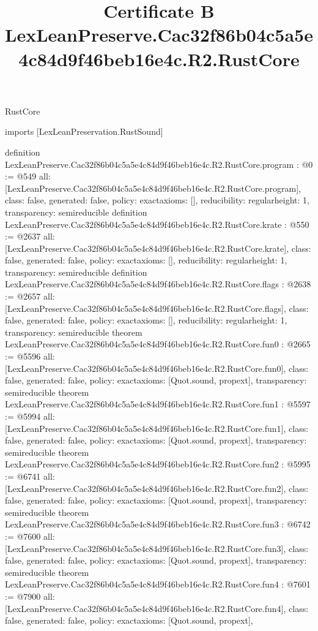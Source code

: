 \begin{lexlean}{RustCore}
\title{Certificate B LexLeanPreserve.Cac32f86b04c5a5e4c84d9f46beb16e4c.R2.RustCore}
\begin{coremodule}
imports [LexLeanPreservation.RustSound]

definition LexLeanPreserve.Cac32f86b04c5a5e4c84d9f46beb16e4c.R2.RustCore.program : @0 := @549 {
  all: [LexLeanPreserve.Cac32f86b04c5a5e4c84d9f46beb16e4c.R2.RustCore.program],
  class: false,
  generated: false,
  policy: exact{axioms: []},
  reducibility: regular{height: 1},
  transparency: semireducible
}
definition LexLeanPreserve.Cac32f86b04c5a5e4c84d9f46beb16e4c.R2.RustCore.krate : @550 := @2637 {
  all: [LexLeanPreserve.Cac32f86b04c5a5e4c84d9f46beb16e4c.R2.RustCore.krate],
  class: false,
  generated: false,
  policy: exact{axioms: []},
  reducibility: regular{height: 1},
  transparency: semireducible
}
definition LexLeanPreserve.Cac32f86b04c5a5e4c84d9f46beb16e4c.R2.RustCore.flags : @2638 := @2657 {
  all: [LexLeanPreserve.Cac32f86b04c5a5e4c84d9f46beb16e4c.R2.RustCore.flags],
  class: false,
  generated: false,
  policy: exact{axioms: []},
  reducibility: regular{height: 1},
  transparency: semireducible
}
theorem LexLeanPreserve.Cac32f86b04c5a5e4c84d9f46beb16e4c.R2.RustCore.fun0 : @2665 := @5596 {
  all: [LexLeanPreserve.Cac32f86b04c5a5e4c84d9f46beb16e4c.R2.RustCore.fun0],
  class: false,
  generated: false,
  policy: exact{axioms: [Quot.sound, propext]},
  transparency: semireducible
}
theorem LexLeanPreserve.Cac32f86b04c5a5e4c84d9f46beb16e4c.R2.RustCore.fun1 : @5597 := @5994 {
  all: [LexLeanPreserve.Cac32f86b04c5a5e4c84d9f46beb16e4c.R2.RustCore.fun1],
  class: false,
  generated: false,
  policy: exact{axioms: [Quot.sound, propext]},
  transparency: semireducible
}
theorem LexLeanPreserve.Cac32f86b04c5a5e4c84d9f46beb16e4c.R2.RustCore.fun2 : @5995 := @6741 {
  all: [LexLeanPreserve.Cac32f86b04c5a5e4c84d9f46beb16e4c.R2.RustCore.fun2],
  class: false,
  generated: false,
  policy: exact{axioms: [Quot.sound, propext]},
  transparency: semireducible
}
theorem LexLeanPreserve.Cac32f86b04c5a5e4c84d9f46beb16e4c.R2.RustCore.fun3 : @6742 := @7600 {
  all: [LexLeanPreserve.Cac32f86b04c5a5e4c84d9f46beb16e4c.R2.RustCore.fun3],
  class: false,
  generated: false,
  policy: exact{axioms: [Quot.sound, propext]},
  transparency: semireducible
}
theorem LexLeanPreserve.Cac32f86b04c5a5e4c84d9f46beb16e4c.R2.RustCore.fun4 : @7601 := @7900 {
  all: [LexLeanPreserve.Cac32f86b04c5a5e4c84d9f46beb16e4c.R2.RustCore.fun4],
  class: false,
  generated: false,
  policy: exact{axioms: [Quot.sound, propext]},
}
\end{coremodule}
\end{lexlean}
